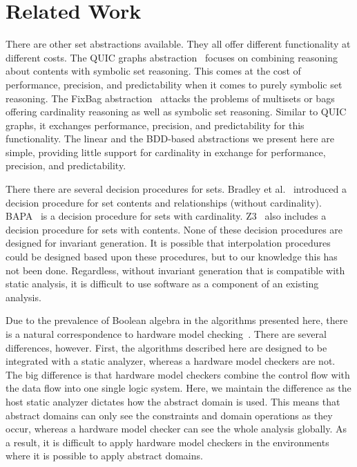 \section{Related Work}
There are other set abstractions available.  They all offer different functionality at different costs.  The QUIC graphs abstraction~\cite{ab:ecoop:13,quicr:cav:14} focuses on combining reasoning about contents with symbolic set reasoning.  This comes at the cost of performance, precision, and predictability when it comes to purely symbolic set reasoning.  The FixBag abstraction~\cite{fixbag:cav:11} attacks the problems of multisets or bags offering cardinality reasoning as well as symbolic set reasoning.  Similar to QUIC graphs, it exchanges performance, precision, and predictability for this functionality.  The linear and the BDD-based abstractions we present here are simple, providing little support for cardinality in exchange for performance, precision, and predictability.

There there are several decision procedures for sets.  Bradley et al.~\cite{bradley:vmcai:06} introduced a decision procedure for set contents and relationships (without cardinality).  BAPA~\cite{knr:jar:06,jahob:thesis:07} is a decision procedure for sets with cardinality.  Z3~\cite{mb:tacas:08} also includes a decision procedure for sets with contents.  None of these decision procedures are designed for invariant generation.  It is possible that interpolation procedures~\cite{interp:cav:03} could be designed based upon these procedures, but to our knowledge this has not been done.  Regardless, without invariant generation that is compatible with static analysis, it is difficult to use software as a component of an existing analysis.

Due to the prevalence of Boolean algebra in the algorithms presented here, there is a natural correspondence to hardware model checking~\cite{mc:toplas:86}.  There are several differences, however.  First, the algorithms described here are designed to be integrated with a static analyzer, whereas a hardware model checkers are not.  The big difference is that hardware model checkers combine the control flow with the data flow into one single logic system.  Here, we maintain the difference as the host static analyzer dictates how the abstract domain is used.  This means that abstract domains can only see the constraints and domain operations as they occur, whereas a hardware model checker can see the whole analysis globally.  As a result, it is difficult to apply hardware model checkers in the environments where it is possible to apply abstract domains.